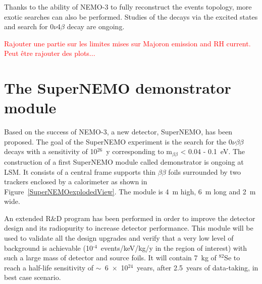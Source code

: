 \documentclass[main.tex]{subfiles}
\begin{document}
\NI Thanks to the ability of NEMO-3 to fully reconstruct the events topology, more exotic searches can also be performed. Studies of the decays via the excited states and search for 0$\nu$4$\beta$ decay are ongoing.

\bigskip


\NI \textcolor{red}{Rajouter une partie sur les limites mises sur Majoron emission and RH current. Peut être rajouter des plots...}


\FloatBarrier

\newpage


\section{The SuperNEMO demonstrator module}\label{sec:SuperNEMO}


\NI Based on the success of NEMO-3, a new detector, SuperNEMO, has been proposed. The goal of the SuperNEMO experiment is the search for the 0$\nu\beta\beta$ decays with a sensitivity of 10$^{\text{26}}$~y corresponding to m$_{\beta\beta}$ < 0.04 - 0.1~eV. The construction of a first SuperNEMO module called demonstrator is ongoing at LSM. It consists of a central frame supports thin $\beta\beta$ foils surrounded by two trackers enclosed by a calorimeter as shown in Figure~\ref{SuperNEMOexplodedView}. The module is 4~m high, 6~m long and 2~m wide.


\bigskip


\NI An extended R\&D program has been performed in order to improve the detector design and its radiopurity to increase detector performance. This module will be used to validate all the design upgrades and verify that a very low level of background is achievable (10$^{\text{-4}}$~events/keV/kg/y in the region of interest) with such a large mass of detector and source foils. It will contain 7~kg of $^{\text{82}}$Se to reach a half-life sensitivity of $\sim$~6~$\times$~10$^{\text{24}}$~years, after 2.5~years of data-taking, in best case scenario.
\end{document}
